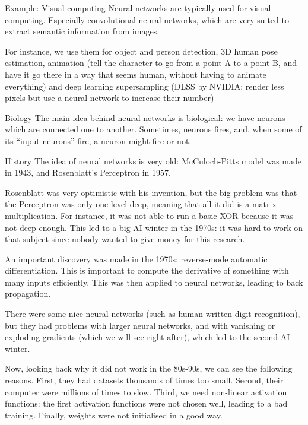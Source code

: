 \documentclass[a4paper]{article}
\begin{document}
\begin{parag}{Example: Visual computing}
    Neural networks are typically used for visual computing. Especially convolutional neural networks, which are very suited to extract semantic information from images.

    For instance, we use them for object and person detection, 3D human pose estimation, animation (tell the character to go from a point A to a point B, and have it go there in a way that seems human, without having to animate everything) and deep learning supersampling (DLSS by NVIDIA; render less pixels but use a neural network to increase their number)
\end{parag}

\begin{parag}{Biology}
    The main idea behind neural networks is biological: we have neurons which are connected one to another. Sometimes, neurons fires, and, when some of its ``input neurons'' fire, a neuron might fire or not.
\end{parag}

\begin{parag}{History}
    The idea of neural networks is very old: McCuloch-Pitts model was made in 1943, and Rosenblatt's Perceptron in 1957.

    Rosenblatt was very optimistic with his invention, but the big problem was that the Perceptron was only one level deep, meaning that all it did is a matrix multiplication. For instance, it was not able to run a basic XOR because it was not deep enough. This led to a big AI winter in the 1970s: it was hard to work on that subject since nobody wanted to give money for this research.

    An important discovery was made in the 1970s: reverse-mode automatic differentiation. This is important to compute the derivative of something with many inputs efficiently. This was then applied to neural networks, leading to back propagation.

    There were some nice neural networks (such as human-written digit recognition), but they had problems with larger neural networks, and with vanishing or exploding gradients (which we will see right after), which led to the second AI winter.

    Now, looking back why it did not work in the 80s-90s, we can see the following reasons. First, they had datasets thousands of times too small. Second, their computer were millions of times to slow. Third, we need non-linear activation functions: the first activation functions were not chosen well, leading to a bad training. Finally, weights were not initialised in a good way. 
\end{parag}
\end{document}
